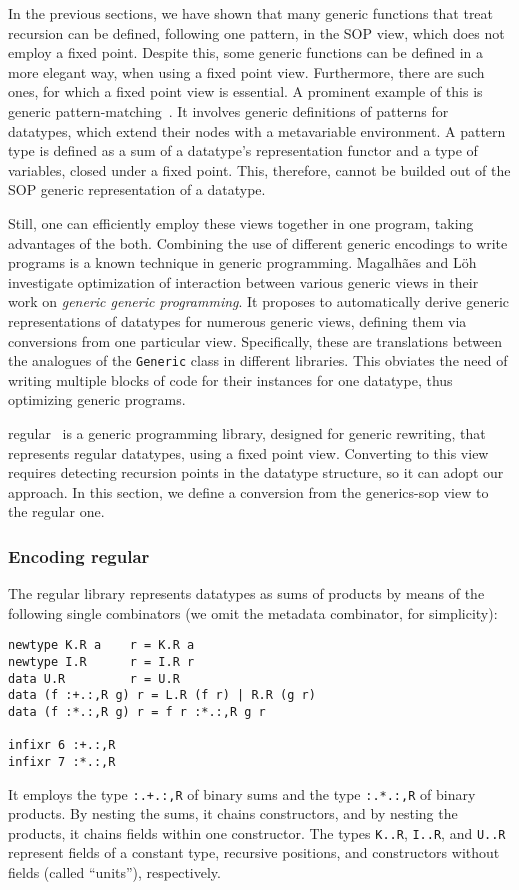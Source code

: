 \documentclass[runningheads]{llncs}
\newcommand{\K}[1]{\lstinline[style=fancy]{#1}}
\begin{document}
In the previous sections, we have shown that many generic functions that treat recursion can be defined, following one pattern, in the SOP view, which does not employ a fixed point. Despite this, some generic functions can be defined in a more elegant way, when using a fixed point view. Furthermore, there are such ones, for which a fixed point view is essential. A prominent example of this is generic pattern-matching~\cite{VanNoort2008}. It involves generic definitions of patterns for datatypes, which extend their nodes with a metavariable environment. A pattern type is defined as a sum of a datatype's representation functor and a type of variables, closed under a fixed point. This, therefore, cannot be builded out of the SOP generic representation of a datatype.

Still, one can efficiently employ these views together in one program, taking advantages of the both. Combining the use of different generic encodings to write programs is a known technique in generic programming. Magalh{\~a}es and L{\"o}h~\cite{MagLoeh2014} investigate optimization of interaction between various generic views in their work on \emph{generic generic programming}. It proposes to automatically derive generic representations of datatypes for numerous generic views, defining them via conversions from one particular view. Specifically, these are translations between the analogues of the \K{Generic} class in different libraries. This obviates the need of writing multiple blocks of code for their instances for one datatype, thus optimizing generic programs.

\textsf{regular}~\cite{VanNoort2008} is a generic programming library, designed for generic rewriting, that represents regular datatypes, using a fixed point view. Converting to this view requires detecting recursion points in the datatype structure, so it can adopt our approach. In this section, we define a conversion from the \textsf{generics-sop} view to the \textsf{regular} one.

\subsubsection{Encoding \textsf{\textmd{regular}}}

The \textsf{regular} library represents datatypes as sums of products by means of the following single combinators (we omit the metadata combinator, for simplicity):
\begin{lstlisting}[style=fancy]
newtype K.R a    r = K.R a
newtype I.R      r = I.R r
data U.R         r = U.R
data (f :+.:,R g) r = L.R (f r) | R.R (g r)
data (f :*.:,R g) r = f r :*.:,R g r

infixr 6 :+.:,R
infixr 7 :*.:,R
\end{lstlisting}
It employs the type \K{:.+.:,R} of binary sums and the type \K{:.*.:,R} of binary products. By nesting the sums, it chains constructors, and by nesting the products, it chains fields within one constructor. The types \K{K..R}, \K{I..R}, and \K{U..R} represent fields of a constant type, recursive positions, and constructors without fields (called ``units''), respectively.
\end{document}
